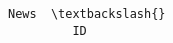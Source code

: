 \documentclass[11pt]{article}
\begin{document}
\begin{Verbatim}[commandchars=\\\{\}]
                                                                                                                                                                                                                                                                              News  \textbackslash{}
         ID                                                                                                                                                                                                                                                                                                                                                                                                                                                                                                                                                                                                                                                                                                                                                                                                                                                                                                                                                                                                                                                                                                                                                                                                                                                                                                                                                                                                                                                                                                                                                                                                                                                                                                                                                                                                                                                                                                                                                                                                                                                                                                                                                                                                                                                                                                                                                                                                                                                                                                                                                                                                                                                                                                                                                                                                                                                                                                                                                                                                                                                                                                                                   

\end{Verbatim}
\end{document}
